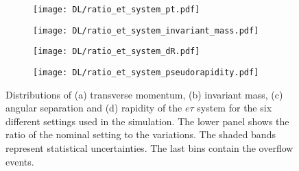 \begin{figure}[H]
    \centering
    \begin{subfigure}{0.49\textwidth}
        \centering
        \texttt{[image: DL/ratio\_et\_system\_pt.pdf]}
        \caption{}
        \label{app:subfig:pt(et)_DL}
    \end{subfigure}
    \begin{subfigure}{0.49\textwidth}
        \centering
        \texttt{[image: DL/ratio\_et\_system\_invariant\_mass.pdf]}
        \caption{}
        \label{app:subfig:m(et)_DL}
    \end{subfigure}

    \vspace{0.2cm}
    
    \begin{subfigure}{0.49\textwidth}
        \centering
        \texttt{[image: DL/ratio\_et\_system\_dR.pdf]}
        \caption{}
        \label{app:subfig:dR(et)_DL}
    \end{subfigure}
    \begin{subfigure}{0.49\textwidth}
        \centering
        \texttt{[image: DL/ratio\_et\_system\_pseudorapidity.pdf]}
        \caption{}
        \label{app:subfig:eta(et)_DL}
    \end{subfigure}
    \caption{Distributions of (a) transverse momentum, (b) invariant mass,  (c) angular separation and (d) rapidity of the $e\tau$ system for the six different settings used in the simulation. The lower panel shows the ratio of the nominal setting to the variations. The shaded bands represent statistical uncertainties. The last bins contain the overflow events.}
    \label{app:fig:etau_DL}
\end{figure}


